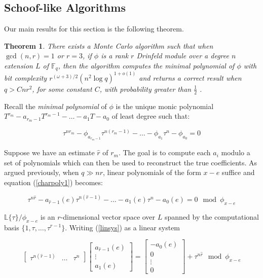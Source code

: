 \documentclass[sigconf]{acmart}
\newtheorem{theorem}{Theorem}
\newcommand{\F}{\mathbb{F}}
\renewcommand{\L}{\mathbb{L}}
\newcommand{\hatr}{\hat{r}}
\begin{document}
\subsection{Schoof-like Algorithms}

Our main results for this section is the following theorem.

\begin{theorem}\label{schooflike}
There exists a Monte Carlo algorithm such that when $\gcd(n,r) = 1$ or $r = 3$, if $\phi$ is a rank $r$ Drinfeld module over a degree $n$ extension $L$ of  $\F_q$, then the algorithm computes the minimal polynomial of $\phi$ with bit complexity $r^{(\omega+3)/2}(n^2 \log q)^{1 + o(1)}$ and returns a correct result when $q > Cnr^2$, for some constant $C$, with probability greater than $\frac{1}{2}$ .
\end{theorem}

Recall the \textit{minimal polynomial} of $\phi$ is the unique monic polynomial $T^{r_m} - a_{r_m-1}T^{r_m-1} - \ldots - a_1T - a_0$ of least degree such that:

\begin{equation} \label{charpoly1}
 \tau^{nr_m} - \phi_{a_{r_m-1}}\tau^{n(r_m-1)} - \ldots - \phi_{a_1} \tau^n - \phi_{a_0} = 0
\end{equation}


Suppose we have an estimate $\hatr$ of $r_m$. The goal is to compute each $a_i$ modulo a set of polynomials which can then be used to reconstruct the true coefficients. As argued previously, when $q \gg nr$, linear polynomials of the form $x - e$ suffice and equation (\ref{charpoly1}) becomes:

\begin{equation}\label{linsys}
\tau^{n\hatr} - a_{\hatr-1}(e)\tau^{n(\hatr-1)} - \ldots - a_1(e)\tau^n - a_0(e)  = 0 \mod \phi_{x - e}
\end{equation}

$\L\{\tau \}/\phi_{x-e}$ is an $r$-dimensional vector space over $L$ spanned by the computational basis $\{1, \tau, \ldots, \tau^{r-1}\}$. Writing (\ref{linsys}) as a linear system

\begin{equation}\label{system1} \begin{bmatrix} \tau^{n(\hatr-1)} & \ldots & \tau^{n} \end{bmatrix} \begin{bmatrix} a_{\hatr-1}(e) \\ \vdots \\ a_1(e) \end{bmatrix} = \begin{bmatrix}  -a_0(e) \\ 0 \\ \vdots \\ 0  \end{bmatrix} + \tau^{n\hatr}  \mod \phi_{x-e}
\end{equation}
\end{document}
